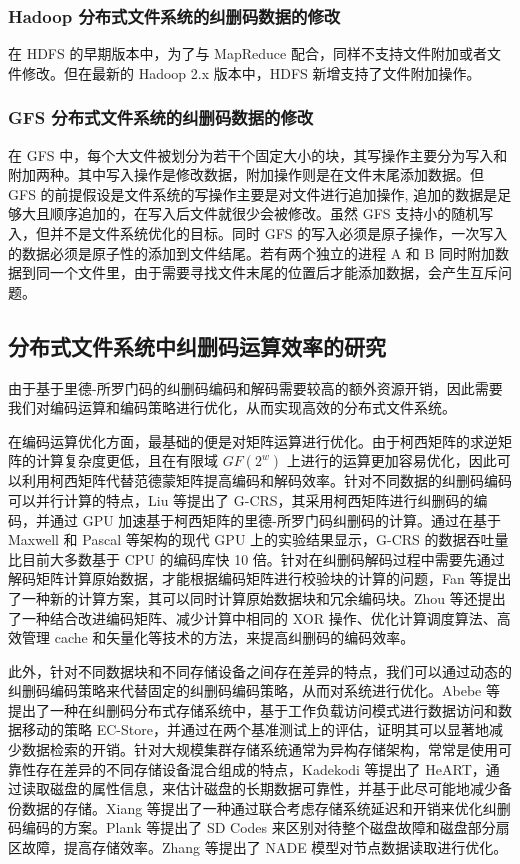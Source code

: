 \subsubsection{Hadoop 分布式文件系统的纠删码数据的修改}
在 HDFS 的早期版本中，为了与 MapReduce 配合，同样不支持文件附加或者文件修改。但在最新的 Hadoop 2.x 版本中，HDFS 新增支持了文件附加操作。
\subsubsection{GFS 分布式文件系统的纠删码数据的修改}
在 GFS 中，每个大文件被划分为若干个固定大小的块，其写操作主要分为写入和附加两种。其中写入操作是修改数据，附加操作则是在文件末尾添加数据。但 GFS 的前提假设是文件系统的写操作主要是对文件进行追加操作, 追加的数据是足够大且顺序追加的，在写入后文件就很少会被修改。虽然 GFS 支持小的随机写入，但并不是文件系统优化的目标。同时 GFS 的写入必须是原子操作，一次写入的数据必须是原子性的添加到文件结尾。若有两个独立的进程 A 和 B 同时附加数据到同一个文件里，由于需要寻找文件末尾的位置后才能添加数据，会产生互斥问题。
\subsection{分布式文件系统中纠删码运算效率的研究}
由于基于里德-所罗门码的纠删码编码和解码需要较高的额外资源开销，因此需要我们对编码运算和编码策略进行优化，从而实现高效的分布式文件系统。

在编码运算优化方面，最基础的便是对矩阵运算进行优化。由于柯西矩阵的求逆矩阵的计算复杂度更低，且在有限域 $GF(2^w)$ 上进行的运算更加容易优化，因此可以利用柯西矩阵代替范德蒙矩阵提高编码和解码效率。针对不同数据的纠删码编码可以并行计算的特点，Liu 等\cite{liu2018g}提出了 G-CRS，其采用柯西矩阵进行纠删码的编码，并通过 GPU 加速基于柯西矩阵的里德-所罗门码纠删码的计算。通过在基于 Maxwell 和 Pascal 等架构的现代 GPU 上的实验结果显示，G-CRS 的数据吞吐量比目前大多数基于 CPU 的编码库快 10 倍。针对在纠删码解码过程中需要先通过解码矩阵计算原始数据，才能根据编码矩阵进行校验块的计算的问题，Fan 等\cite{fan2019new}提出了一种新的计算方案，其可以同时计算原始数据块和冗余编码块。Zhou 等\cite{zhou2019fast}还提出了一种结合改进编码矩阵、减少计算中相同的 XOR 操作、优化计算调度算法、高效管理 cache 和矢量化等技术的方法，来提高纠删码的编码效率。

此外，针对不同数据块和不同存储设备之间存在差异的特点，我们可以通过动态的纠删码编码策略来代替固定的纠删码编码策略，从而对系统进行优化。Abebe 等\cite{abebe2018ec}提出了一种在纠删码分布式存储系统中，基于工作负载访问模式进行数据访问和数据移动的策略 EC-Store，并通过在两个基准测试上的评估，证明其可以显著地减少数据检索的开销。针对大规模集群存储系统通常为异构存储架构，常常是使用可靠性存在差异的不同存储设备混合组成的特点，Kadekodi 等\cite{kadekodi2019cluster}提出了 HeART，通过读取磁盘的属性信息，来估计磁盘的长期数据可靠性，并基于此尽可能地减少备份数据的存储。Xiang 等\cite{xiang2015joint}提出了一种通过联合考虑存储系统延迟和开销来优化纠删码编码的方案。Plank 等\cite{plank2014sector}提出了 SD Codes 来区别对待整个磁盘故障和磁盘部分扇区故障，提高存储效率。Zhang 等\cite{zhang2019nade}提出了 NADE 模型对节点数据读取进行优化。

